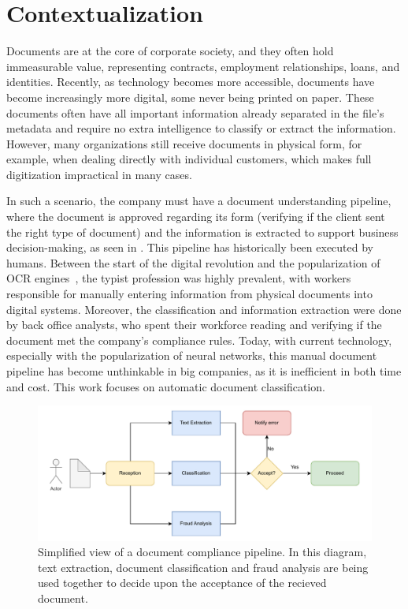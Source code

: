 \section{Contextualization}

Documents are at the core of corporate society, and they often hold immeasurable value, representing contracts, employment relationships, loans, and identities. Recently, as technology becomes more accessible, documents have become increasingly more digital, some never being printed on paper. These documents often have all important information already separated in the file's metadata and require no extra intelligence to classify or extract the information. However, many organizations still receive documents in physical form, for example, when dealing directly with individual customers, which makes full digitization impractical in many cases.

In such a scenario, the company must have a document understanding pipeline, where the document is approved regarding its form (verifying if the client sent the right type of document) and the information is extracted to support business decision-making, as seen in . This pipeline has historically been executed by humans. Between the start of the digital revolution and the popularization of \gls{OCR} engines~\cite{kay_tesseract_2007, doctr2021}, the typist profession was highly prevalent, with workers responsible for manually entering information from physical documents into digital systems. Moreover, the classification and information extraction were done by back office analysts, who spent their workforce reading and verifying if the document met the company's compliance rules. Today, with current technology, especially with the popularization of neural networks, this manual document pipeline has become unthinkable in big companies, as it is inefficient in both time and cost. This work focuses on automatic document classification.

\begin{figure}[htbp]
\label{fig:compliance}
\centering
\includegraphics[width=1\linewidth]{images/diagrama-compliance.drawio.pdf}
\caption{Simplified view of a document compliance pipeline. In this diagram, text extraction, document classification and fraud analysis are being used together to decide upon the acceptance of the recieved document.}
\end{figure}

